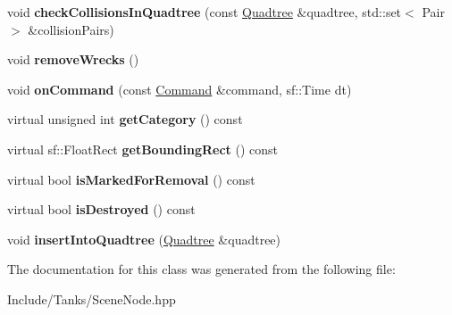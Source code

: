 \begin{DoxyCompactItemize}
\item 
\hypertarget{class_scene_node_a3b15fb3228666c1e125c051172d16dd6}{}void {\bfseries check\+Collisions\+In\+Quadtree} (const \hyperlink{class_quadtree}{Quadtree} \&quadtree, std\+::set$<$ Pair $>$ \&collision\+Pairs)\label{class_scene_node_a3b15fb3228666c1e125c051172d16dd6}

\item 
\hypertarget{class_scene_node_a4ab07dfa68f4094e2e9152b6f4869794}{}void {\bfseries remove\+Wrecks} ()\label{class_scene_node_a4ab07dfa68f4094e2e9152b6f4869794}

\item 
\hypertarget{class_scene_node_af6f126fe8727414a0c967f84f9754968}{}void {\bfseries on\+Command} (const \hyperlink{struct_command}{Command} \&command, sf\+::\+Time dt)\label{class_scene_node_af6f126fe8727414a0c967f84f9754968}

\item 
\hypertarget{class_scene_node_a72984f6cf6427652da17e2e7dc9edb84}{}virtual unsigned int {\bfseries get\+Category} () const \label{class_scene_node_a72984f6cf6427652da17e2e7dc9edb84}

\item 
\hypertarget{class_scene_node_a6bcdee1ae95e703567854b832de3cbd2}{}virtual sf\+::\+Float\+Rect {\bfseries get\+Bounding\+Rect} () const \label{class_scene_node_a6bcdee1ae95e703567854b832de3cbd2}

\item 
\hypertarget{class_scene_node_a7a3cd583ac2252d19f12f6ab80df8a4a}{}virtual bool {\bfseries is\+Marked\+For\+Removal} () const \label{class_scene_node_a7a3cd583ac2252d19f12f6ab80df8a4a}

\item 
\hypertarget{class_scene_node_aa5ab9eec31659d093d4aa48d69573de9}{}virtual bool {\bfseries is\+Destroyed} () const \label{class_scene_node_aa5ab9eec31659d093d4aa48d69573de9}

\item 
\hypertarget{class_scene_node_a3204ee8a2551705287b06efc4590909e}{}void {\bfseries insert\+Into\+Quadtree} (\hyperlink{class_quadtree}{Quadtree} \&quadtree)\label{class_scene_node_a3204ee8a2551705287b06efc4590909e}

\end{DoxyCompactItemize}


The documentation for this class was generated from the following file\+:\begin{DoxyCompactItemize}
\item 
Include/\+Tanks/Scene\+Node.\+hpp\end{DoxyCompactItemize}
